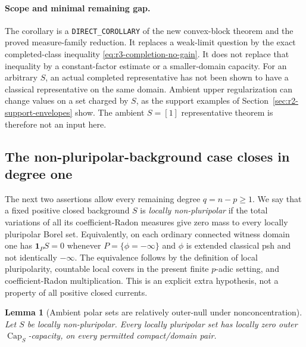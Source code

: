 \documentclass[11pt,a4paper]{article}
\numberwithin{equation}{section}
\newtheorem{lemma}[theorem]{Lemma}
\theoremstyle{definition}
\theoremstyle{remark}
\begin{document}
\paragraph{Scope and minimal remaining gap.}
The corollary is a \texttt{DIRECT\_COROLLARY} of the new convex-block
theorem and the proved measure-family reduction. It replaces a
weak-limit question by the exact completed-class inequality
\eqref{eq:r3-completion-no-gain}. It does not replace that
inequality by a constant-factor estimate or a smaller-domain
capacity. For an arbitrary $S$, an actual completed representative
has not been shown to have a classical representative on the same
domain. Ambient upper regularization can change values on a set
charged by $S$, as the support examples of
Section~\ref{sec:r2-support-envelopes} show. The ambient
$S=[1]$ representative theorem is therefore not an input here.

\subsection{The non-pluripolar-background case closes in degree one}

The next two assertions allow every remaining degree $q=n-p\geq1$.
We say that a fixed positive closed background $S$ is
\emph{locally non-pluripolar} if the total variations of all its
coefficient-Radon measures give zero mass to every locally
pluripolar Borel set. Equivalently,
on each ordinary connected witness domain one has
$\mathbf1_P S=0$ whenever
$P=\{\phi=-\infty\}$ and $\phi$ is extended classical psh and
not identically $-\infty$. The equivalence follows by the
definition of local pluripolarity, countable local covers in
the present finite $p$-adic setting, and coefficient-Radon
multiplication. This is an explicit extra hypothesis, not a
property of all positive closed currents.

\begin{lemma}[Ambient polar sets are relatively outer-null under nonconcentration]
\label{lem:r3-nonpolar-relative-null}
Let $S$ be locally non-pluripolar. Every locally pluripolar set
has locally zero outer $\operatorname{Cap}_S$-capacity, on every
permitted compact/domain pair.
\end{lemma}
\end{document}
